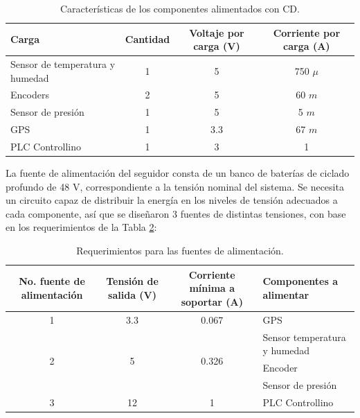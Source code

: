 \begin{table}[H]
	\centering
	\caption{Características de los componentes alimentados con CD.}
	\begin{tabular}{|p{16em}|c|c|c|}
		\hline
		\textbf{\small Carga } & \multicolumn{1}{p{4em}|}{\textbf{\small Cantidad}} & \multicolumn{1}{p{5.5em}|}{\textbf{\small Voltaje por carga (V)}} & \multicolumn{1}{p{6.5em}|}{\textbf{\small Corriente por carga (A)}} \\
		\hline
		\small Sensor de temperatura y humedad \cite{DDEs1} & \small 1     & \small 5     & \small 750 $\mu$ \\
		\hline
		\small Encoders \cite{DDA6} & \small 2     & \small 5     & \small 60 $m$ \\
		\hline
		\small Sensor de presión \cite{DDEs2} & \small 1     & \small 5     & \small 5 $m$ \\
		\hline
		\small GPS \cite{DDC4}  & \small 1     & \small 3.3   & \small 67 $m$ \\
		\hline
		PLC Controllino \cite{IS1} & \small 1     & \small 3     & \small 1 \\
		\hline
	\end{tabular}%
	\label{tab:compoDC}%
\end{table}%

La fuente de alimentación del seguidor consta de un banco de baterías de ciclado profundo de 48 V, correspondiente a la tensión nominal del sistema. Se necesita un circuito capaz de distribuir la energía en los niveles de tensión adecuados a cada componente, así que se diseñaron 3 fuentes de distintas tensiones, con base en los requerimientos de la Tabla \ref{tab:Fuentes2}:

\begin{table}[H]
	\centering
	\caption{Requerimientos para las fuentes de alimentación.}
	\begin{tabular}{|c|c|c|p{9em}|}
		\hline
		\multicolumn{1}{|p{7.07em}|}{\textbf{No. fuente de alimentación}} & \multicolumn{1}{p{6em}|}{\textbf{Tensión de salida (V)}} & \multicolumn{1}{p{9.07em}|}{\textbf{Corriente mínima a soportar (A)}} & \textbf{Componentes a alimentar} \\
		\hline
		\hline
		1     & 3.3   & 0.067  & GPS \\
		\hline
		\multirow{3}[6]{*}{2} & \multirow{3}[6]{*}{5} & \multirow{3}[6]{*}{0.326} & Sensor temperatura y humedad \\
		\cline{4-4}          &       &       & Encoder  \\
		\cline{4-4}          &       &       & Sensor de presión \\ 
		\hline
		3     & 12   & 1  & PLC Controllino \\
		\hline
	\end{tabular}%
	\label{tab:Fuentes2}%
\end{table}%

